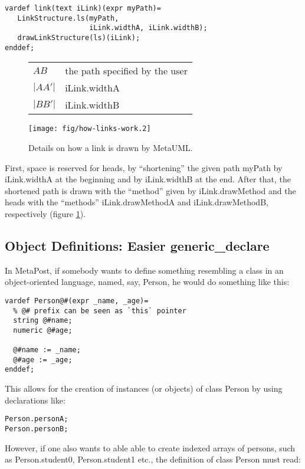 \documentclass{article}
\newcommand{\code}{\ttfamily}
\begin{document}
\begin{verbatim}
vardef link(text iLink)(expr myPath)=
   LinkStructure.ls(myPath,
                    iLink.widthA, iLink.widthB);
   drawLinkStructure(ls)(iLink);
enddef;
\end{verbatim}

\begin{figure}
\centering
\begin{tabular}{l|l}
$AB$ & the path specified by the user \\
$|AA'|$ & {\code iLink.widthA}\\
$|BB'|$ & {\code iLink.widthB}
\end{tabular}
\texttt{[image: fig/how-links-work.2]}
\caption{Details on how a link is drawn by MetaUML.}
\label{fig:hlw2}
\end{figure}

First, space is reserved for heads, by ``shortening'' the given path {\code myPath}
by {\code iLink.widthA} at the beginning and by {\code iLink.widthB} at the end.
After that, the shortened path is drawn with the ``method''
given by {\code iLink.drawMethod} and the heads with the ``methods''
{\code iLink.drawMethodA} and {\code iLink.drawMethodB},
respectively (figure \ref{fig:hlw2}).

\subsection{Object Definitions: Easier {\code generic\_declare}}

In MetaPost, if somebody wants to define something resembling a class in an object-oriented language,
named, say, {\code Person}, he would do something like this:

\begin{verbatim}
vardef Person@#(expr _name, _age)=
  % @# prefix can be seen as `this` pointer
  string @#name;
  numeric @#age;

  @#name := _name;
  @#age := _age;
enddef;
\end{verbatim}

This allows for the creation of instances (or objects) of class {\code Person} by using
declarations like:

\begin{verbatim}
Person.personA;
Person.personB;
\end{verbatim}

 However, if one also wants to able able to create indexed arrays of persons, such as
{\code Person.student0}, {\code Person.student1} etc., the definition of class
{\code Person} must read:
\end{document}
